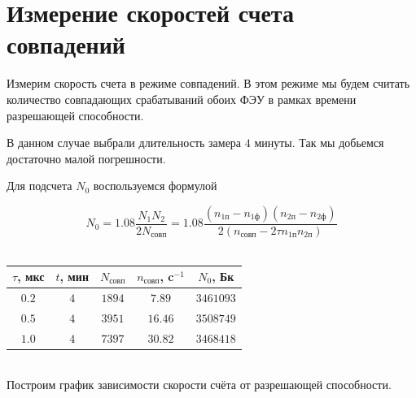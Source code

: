 \documentclass[12pt]{article}
\begin{document}
  \section{Измерение скоростей счета совпадений}

    Измерим скорость счета в режиме совпадений. В этом режиме мы будем считать
    количество совпадающих срабатываний обоих ФЭУ в рамках времени разрешающей
    способности.

    В данном случае выбрали длительность замера $4$ минуты. Так мы добьемся
    достаточно малой погрешности.

    Для подсчета $N_0$ воспользуемся формулой

    $$
      N_0 = 1.08 \frac{N_1 N_2}{2 N_{совп}} =
      1.08 \frac{\left(n_{1п} - n_{1ф}\right)\left(n_{2п} - n_{2ф}\right)}
      {2 \left(n_{совп} - 2 \tau n_{1п} n_{2п}\right)}
    $$ \\

    \begin{tabular}{ || c || c | c | c | c ||}
      \hline
      $\tau$, мкс & $t$, мин & $N_{совп}$ & $n_{совп}$, c$^{-1}$ & $N_0$, Бк \\
      \hline
      $0.2$ & $4$ & $1894$ & $7.89$ & $3461093$ \\
      $0.5$ & $4$ & $3951$ & $16.46$ & $3508749$ \\
      $1.0$ & $4$ & $7397$ & $30.82$ & $3468418$ \\
      \hline
    \end{tabular} \\

    Построим график зависимости скорости счёта от разрешающей способности.

    \begin{figure}[h!]
      \begin{minipage}[h]{0.6\linewidth}
      \end{minipage}
      \label{plot}
    \end{figure}
\end{document}
